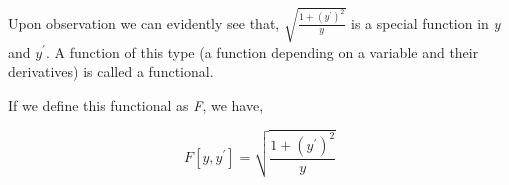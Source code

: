 {Upon observation we can evidently see that, $\sqrt{\frac{1 + \left(y^{\prime}\right)^2}{y}}$ is a special function in \textit{y} and \textit{$y^\prime$}. A function of this type (a function depending on a variable and their derivatives) is called a functional.}

{If we define this functional as \textit{F}, we have,}

	$$F[y,y^{\prime}] = \sqrt{\frac{1 + \left(y^{\prime}\right)^2}{y}}$$


